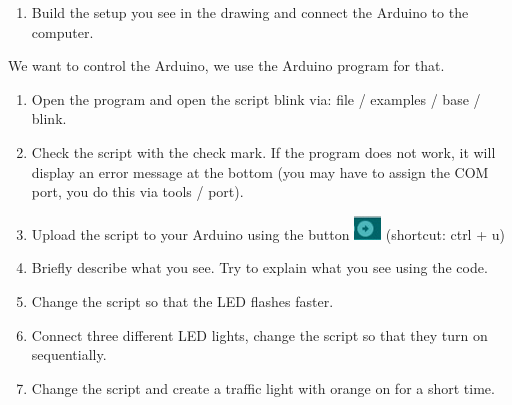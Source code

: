 \documentclass{arduino}
\begin{document}
\begin{enumerate}[label={\alph*})]
\item Build the setup you see in the drawing and connect the Arduino to the computer.
\end{enumerate}

We want to control the Arduino, we use the Arduino program for that.

\begin{enumerate}[label={\alph*})]
\item Open the program and open the script blink via: file / examples / base / blink.

\item Check the script with the check mark. If the program does not work, it will display an error message at the bottom (you may have to assign the COM port, you do this via tools / port).

\item Upload the script to your Arduino using the button \includegraphics{10. Arduino upload} (shortcut: ctrl + u)

\item Briefly describe what you see. Try to explain what you see using the code.

\item Change the script so that the LED flashes faster.

\item Connect three different LED lights, change the script so that they turn on sequentially.

\item Change the script and create a traffic light with orange on for a short time.
\end{enumerate}

\newpage
\end{document}
